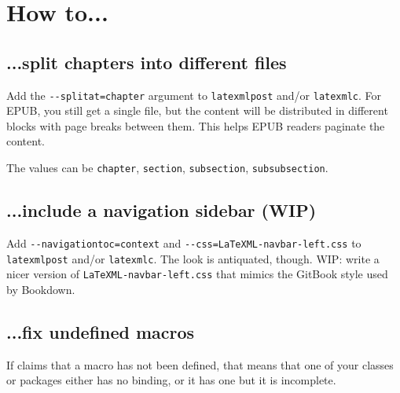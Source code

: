 \documentclass[a4paper]{article}
\theoremstyle{definition}
\begin{document}
\section{How to...}

\subsection{...split chapters into different files}
Add the \verb|--splitat=chapter| argument to \verb|latexmlpost| and/or \verb|latexmlc|. For EPUB, you still get a single file, but the content will be distributed in different blocks with page breaks between them. This helps EPUB readers paginate the content.

The values can be \verb|chapter|, \verb|section|, \verb|subsection|, \verb|subsubsection|.

\subsection{...include a navigation sidebar (WIP)}
Add \verb|--navigationtoc=context| and \verb|--css=LaTeXML-navbar-left.css| to \verb|latexmlpost| and/or \verb|latexmlc|. The look is antiquated, though. WIP: write a nicer version of \verb|LaTeXML-navbar-left.css| that mimics the GitBook style used by Bookdown.

\subsection{...fix undefined macros}
If \LaTeXML{} claims that a macro has not been defined, that means that one of your classes or packages either has no \LaTeXML{} binding, or it has one but it is incomplete.
\end{document}

